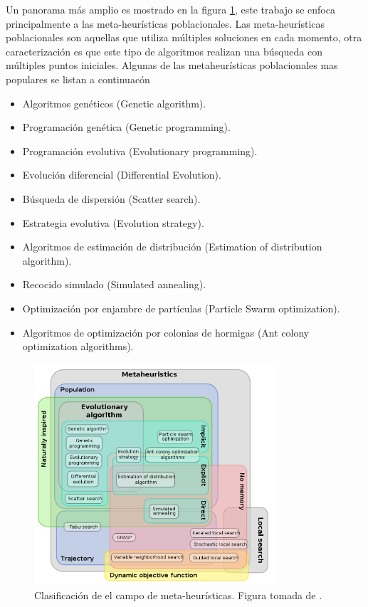 Un panorama más amplio es mostrado en la figura \ref{fig:clasificacion}, este trabajo se enfoca principalmente a las meta-heurísticas poblacionales.
%
Las meta-heurísticas poblacionales son aquellas que utiliza múltiples soluciones en cada momento, otra caracterización es que este tipo de algoritmos realizan una búsqueda con múltiples puntos iniciales.
%
Algunas de las metaheurísticas poblacionales mas populares se listan a continuacón
\begin{itemize}
    \item Algoritmos genéticos (Genetic algorithm).
    \item Programación genética (Genetic programming).
    \item Programación evolutiva (Evolutionary programming).
    \item Evolución diferencial (Differential Evolution).
    \item Búsqueda de dispersión (Scatter search).
    \item Estrategia evolutiva (Evolution strategy).
    \item Algoritmos de estimación de distribución (Estimation of distribution algorithm).
    \item Recocido simulado (Simulated annealing).
    \item Optimización por enjambre de partículas (Particle Swarm optimization).
    \item Algoritmos de optimización por colonias de hormigas (Ant colony optimization algorithms).
\end{itemize}

\begin{figure}[]
\centering
\includegraphics[width=0.8\textwidth]{clasificacion.png}
\caption{Clasificación de el campo de meta-heurísticas. Figura tomada de \cite{beheshti2013review}.}
\label{fig:clasificacion}
\end{figure}



